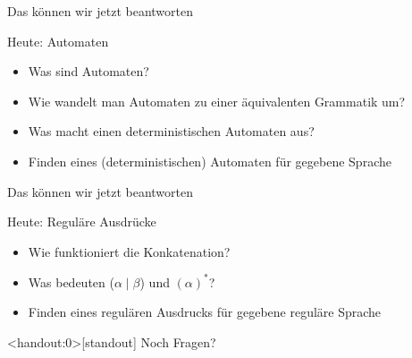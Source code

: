 \begin{frame}[fragile]{Das können wir jetzt beantworten}
	\begin{alertblock}{Heute: Automaten}
		\begin{itemize}
        	\item Was sind Automaten?
			\item Wie wandelt man Automaten zu einer äquivalenten Grammatik um?
			\item Was macht einen deterministischen Automaten aus?
			\item Finden eines (deterministischen) Automaten für gegebene Sprache
		\end{itemize}
	\end{alertblock}
\end{frame}

\begin{frame}[fragile]{Das können wir jetzt beantworten}
	\begin{alertblock}{Heute: Reguläre Ausdrücke}
		\begin{itemize}
			\item Wie funktioniert die Konkatenation?
			\item Was bedeuten ($\alpha \mid \beta$) und $(\alpha)^*$?
			\item Finden eines regulären Ausdrucks für gegebene reguläre Sprache
		\end{itemize}
	\end{alertblock}
\end{frame}

\begin{frame}<handout:0>[standout]
  Noch Fragen?
\end{frame}

